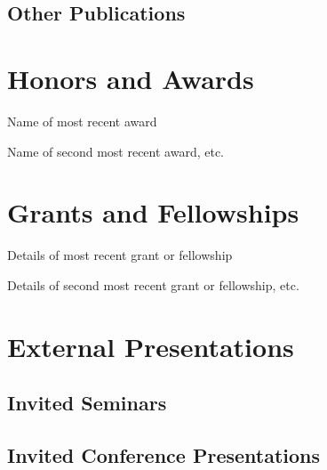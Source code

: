 \documentclass[12pt]{safecv}%
\begin{document}
\subsection*{Other Publications}
\hfill
\section*{Honors and Awards}
\begin{description}[noitemsep]
\item[year] Name of most recent award
\item[year] Name of second most recent award, etc.
\end{description}

\section*{Grants and Fellowships}
\begin{description}[noitemsep]
\item[year] Details of most recent grant or fellowship
\item[year] Details of second most recent grant or fellowship, etc.
\end{description}

\section*{External Presentations}

\subsection*{Invited Seminars}
\subsection*{Invited Conference Presentations}
\end{document}
